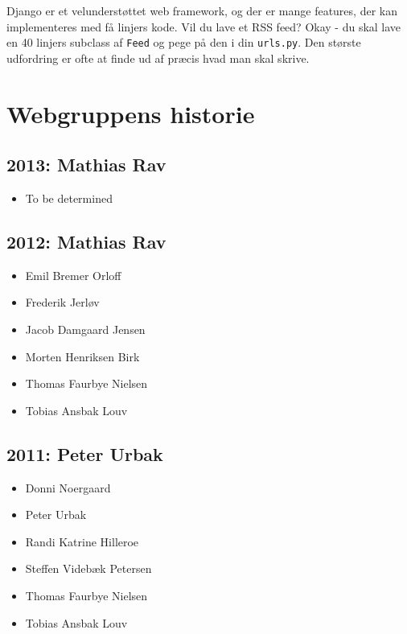\documentclass[article,oneside,a4paper]{memoir}
\begin{document}
Django er et velunderstøttet web framework, og der er mange features, der kan
implementeres med få linjers kode. Vil du lave et RSS feed? Okay - du skal lave
en 40 linjers subclass af \texttt{Feed} og pege på den i din \texttt{urls.py}.
Den største udfordring er ofte at finde ud af præcis hvad man skal skrive.

\chapter{Webgruppens historie}


\section*{2013: Mathias Rav}

\begin{itemize}
  \item To be determined
\end{itemize}

\section*{2012: Mathias Rav}

\begin{itemize}
  \item Emil Bremer Orloff
  \item Frederik Jerløv
  \item Jacob Damgaard Jensen
  \item Morten Henriksen Birk
  \item Thomas Faurbye Nielsen
  \item Tobias Ansbak Louv
\end{itemize}

\section*{2011: Peter Urbak}

\begin{itemize}
  \item Donni Noergaard
  \item Peter Urbak
  \item Randi Katrine Hilleroe
  \item Steffen Videbæk Petersen
  \item Thomas Faurbye Nielsen
  \item Tobias Ansbak Louv
\end{itemize}
\end{document}
